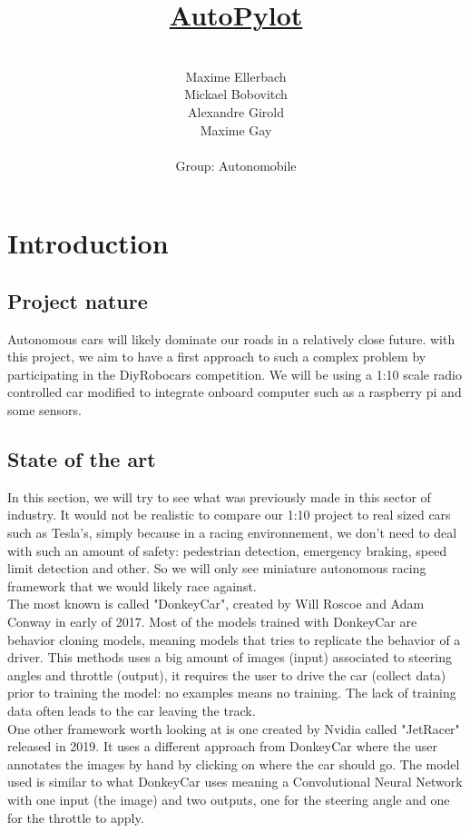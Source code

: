 \documentclass[12pt]{article}
\title{\underline{AutoPylot}}
\date{}
\author{%
    \\
    Maxime Ellerbach \\
    Mickael Bobovitch \\
    Alexandre Girold \\
    Maxime Gay \\ \\
    Group: Autonomobile 
    }
\begin{document}
\maketitle
\newpage

\tableofcontents
\newpage

\section{Introduction}

\subsection{Project nature}
Autonomous cars will likely dominate our roads in a relatively close future.
with this project, we aim to have a first approach to such a complex problem by participating in the DiyRobocars competition.
We will be using a 1:10 scale radio controlled car modified to integrate onboard computer such as a raspberry pi and some sensors.

\subsection{State of the art}
In this section, we will try to see what was previously made in this sector of industry.
It would not be realistic to compare our 1:10 project to real sized cars such as Tesla's, simply because in a racing environnement,
we don't need to deal with such an amount of safety: pedestrian detection, emergency braking, speed limit detection and other.
So we will only see miniature autonomous racing framework that we would likely race against.\\

The most known is called "DonkeyCar", created by Will Roscoe and Adam Conway in early of 2017. Most of the models trained with DonkeyCar are behavior cloning models, meaning models that tries to replicate the behavior of a driver. This methods uses a big amount of images (input) associated to steering angles and throttle (output), it requires the user to drive the car (collect data) prior to training the model: no examples means no training. The lack of training data often leads to the car leaving the track.\\

One other framework worth looking at is one created by Nvidia called "JetRacer" released in 2019. It uses a different approach from DonkeyCar where the user annotates the images by hand by clicking on where the car should go. The model used is similar to what DonkeyCar uses meaning a Convolutional Neural Network with one input (the image) and two outputs, one for the steering angle and one for the throttle to apply.
\end{document}
